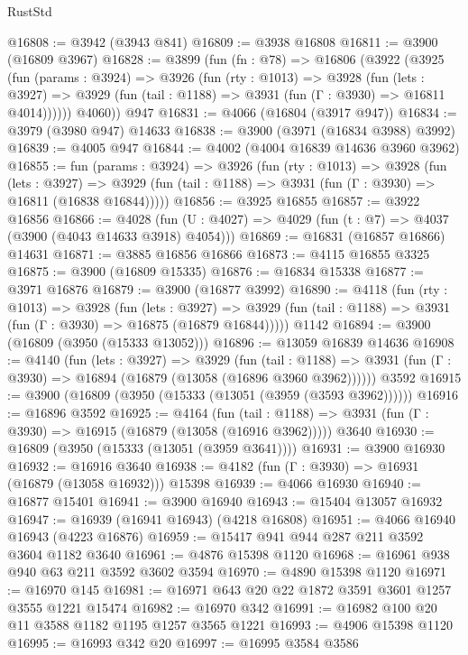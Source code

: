 \begin{lexlean}{RustStd}
\begin{coremodule}
@16808 := @3942 (@3943 @841)
@16809 := @3938 @16808
@16811 := @3900 (@16809 @3967)
@16828 := @3899
    (fun (fn : @78) =>
    @16806
      (@3922
        (@3925
          (fun (params : @3924) =>
          @3926
            (fun (rty : @1013) =>
            @3928
              (fun (lets : @3927) =>
              @3929 (fun (tail : @1188) => @3931 (fun (Γ : @3930) => @16811 @4014))))))
        @4060))
    @947
@16831 := @4066 (@16804 (@3917 @947))
@16834 := @3979 (@3980 @947) @14633
@16838 := @3900 (@3971 (@16834 @3988) @3992)
@16839 := @4005 @947
@16844 := @4002 (@4004 @16839 @14636 @3960 @3962)
@16855 := fun (params : @3924) =>
  @3926
    (fun (rty : @1013) =>
    @3928
      (fun (lets : @3927) =>
      @3929 (fun (tail : @1188) => @3931 (fun (Γ : @3930) => @16811 (@16838 @16844)))))
@16856 := @3925 @16855
@16857 := @3922 @16856
@16866 := @4028
    (fun (U : @4027) => @4029 (fun (t : @7) => @4037 (@3900 (@4043 @14633 @3918) @4054)))
@16869 := @16831 (@16857 @16866) @14631
@16871 := @3885 @16856 @16866
@16873 := @4115 @16855 @3325
@16875 := @3900 (@16809 @15335)
@16876 := @16834 @15338
@16877 := @3971 @16876
@16879 := @3900 (@16877 @3992)
@16890 := @4118
    (fun (rty : @1013) =>
    @3928
      (fun (lets : @3927) =>
      @3929 (fun (tail : @1188) => @3931 (fun (Γ : @3930) => @16875 (@16879 @16844)))))
    @1142
@16894 := @3900 (@16809 (@3950 (@15333 @13052)))
@16896 := @13059 @16839 @14636
@16908 := @4140
    (fun (lets : @3927) =>
    @3929
      (fun (tail : @1188) =>
      @3931 (fun (Γ : @3930) => @16894 (@16879 (@13058 (@16896 @3960 @3962))))))
    @3592
@16915 := @3900 (@16809 (@3950 (@15333 (@13051 (@3959 (@3593 @3962))))))
@16916 := @16896 @3592
@16925 := @4164
    (fun (tail : @1188) => @3931 (fun (Γ : @3930) => @16915 (@16879 (@13058 (@16916 @3962)))))
    @3640
@16930 := @16809 (@3950 (@15333 (@13051 (@3959 @3641))))
@16931 := @3900 @16930
@16932 := @16916 @3640
@16938 := @4182 (fun (Γ : @3930) => @16931 (@16879 (@13058 @16932))) @15398
@16939 := @4066 @16930
@16940 := @16877 @15401
@16941 := @3900 @16940
@16943 := @15404 @13057 @16932
@16947 := @16939 (@16941 @16943) (@4218 @16808)
@16951 := @4066 @16940 @16943 (@4223 @16876)
@16959 := @15417 @941 @944 @287 @211 @3592 @3604 @1182 @3640
@16961 := @4876 @15398 @1120
@16968 := @16961 @938 @940 @63 @211 @3592 @3602 @3594
@16970 := @4890 @15398 @1120
@16971 := @16970 @145
@16981 := @16971 @643 @20 @22 @1872 @3591 @3601 @1257 @3555 @1221 @15474
@16982 := @16970 @342
@16991 := @16982 @100 @20 @11 @3588 @1182 @1195 @1257 @3565 @1221
@16993 := @4906 @15398 @1120
@16995 := @16993 @342 @20
@16997 := @16995 @3584 @3586

\end{coremodule}
\end{lexlean}
